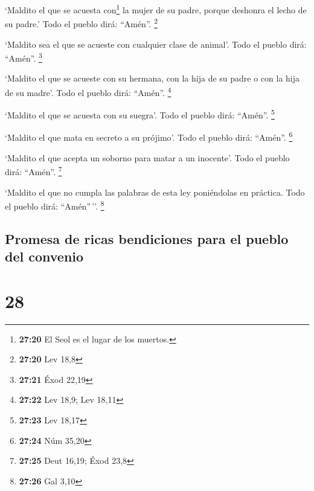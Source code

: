  `Maldito el que se acuesta con\footnote{\textbf{27:20}
  El Seol es el lugar de los muertos.} la mujer de su padre, porque
deshonra el lecho de su padre.' Todo el pueblo dirá: ``Amén''.
\footnote{\textbf{27:20} Lev 18,8}

 `Maldito sea el que se acueste con cualquier clase de
animal'. Todo el pueblo dirá: ``Amén''. \footnote{\textbf{27:21} Éxod
  22,19}

 `Maldito el que se acueste con su hermana, con la hija
de su padre o con la hija de su madre'. Todo el pueblo dirá: ``Amén''.
\footnote{\textbf{27:22} Lev 18,9; Lev 18,11}

 `Maldito el que se acuesta con su suegra'. Todo el
pueblo dirá: ``Amén''. \footnote{\textbf{27:23} Lev 18,17}

 `Maldito el que mata en secreto a su prójimo'. Todo el
pueblo dirá: ``Amén''. \footnote{\textbf{27:24} Núm 35,20}

 `Maldito el que acepta un soborno para matar a un
inocente'. Todo el pueblo dirá: ``Amén''. \footnote{\textbf{27:25} Deut
  16,19; Éxod 23,8}

 `Maldito el que no cumpla las palabras de esta ley
poniéndolas en práctica. Todo el pueblo dirá: ``Amén''\,''. \footnote{\textbf{27:26}
  Gal 3,10}

\hypertarget{promesa-de-ricas-bendiciones-para-el-pueblo-del-convenio}{%
\subsection{Promesa de ricas bendiciones para el pueblo del
convenio}\label{promesa-de-ricas-bendiciones-para-el-pueblo-del-convenio}}

\hypertarget{section-27}{%
\section{28}\label{section-27}}

